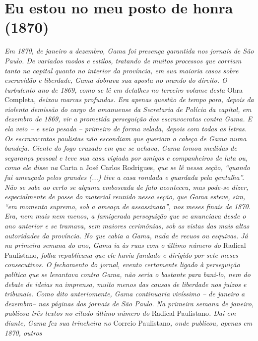 \part{Eu estou no meu posto de honra (1870)}

\begin{argumento}
\emph{Em 1870, de janeiro a dezembro, Gama foi presença garantida nos
jornais de São Paulo. De variados modos e estilos, tratando de muitos
processos que corriam tanto na capital quanto no interior da província,
em sua maioria casos sobre escravidão e liberdade, Gama dobrava sua
aposta no mundo do direito. O turbulento ano de 1869, como se lê em
detalhes no terceiro volume desta} Obra Completa\emph{, deixou marcas
profundas. Era apenas questão de tempo para, depois da violenta demissão
do cargo de amanuense da Secretaria de Polícia da capital, em dezembro
de 1869, vir a prometida perseguição dos escravocratas contra Gama. E
ela veio -- e veio pesada -- primeiro de forma velada, depois com todas
as letras. Os escravocratas paulistas não escondiam que queriam a cabeça
de Gama numa bandeja. Ciente do fogo cruzado em que se achava, Gama
tomou medidas de segurança pessoal e teve sua casa vigiada por amigos e
companheiros de luta ou, como ele disse na} Carta a José Carlos
Rodrigues\emph{, que se lê nessa seção, ``quando fui ameaçado pelos
grandes (...) tive a casa rondada e guardada pela gentalha''. Não se sabe
ao certo se alguma emboscada de fato aconteceu, mas pode-se dizer,
especialmente de posse do material reunido nessa seção, que Gama esteve,
sim, ``em momento supremo, sob a ameaça de assassinato'', nos meses finais
de 1870. Era, nem mais nem menos, a famigerada perseguição que se
anunciava desde o ano anterior e se tramava, sem maiores cerimônias, sob
as vistas das mais altas autoridades da província. No que cabia a Gama,
nada de recuos ou esquivas. Já na primeira semana do ano, Gama ia às
ruas com o último número do} Radical Paulistano\emph{, folha republicana
que ele havia fundado e dirigido por sete meses consecutivos. O
fechamento do jornal, evento certamente ligado à perseguição política
que se levantava contra Gama, não seria o bastante para bani-lo, nem do
debate de ideias na imprensa, muito menos das causas de liberdade nos
juízos e tribunais. Como dito anteriomente, Gama continuaria vivíssimo
-- de janeiro a dezembro-- nas páginas dos jornais de São Paulo. Na
primeira semana de janeiro, publicou três textos no citado último número
do} Radical Paulistano\emph{. Daí em diante, Gama fez sua trincheira no}
Correio Paulistano\emph{, onde publicou, apenas em 1870, outros
}
\end{argumento}
